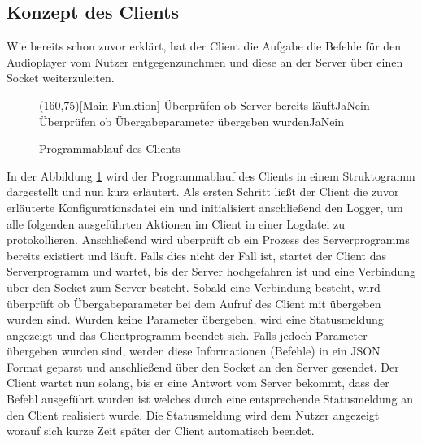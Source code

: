 \subsection{Konzept des Clients}
Wie bereits schon zuvor erklärt, hat der Client die Aufgabe die Befehle für den
Audioplayer vom Nutzer entgegenzunehmen und diese an der Server über einen
Socket weiterzuleiten.

\begin{figure}[H]
    \begin{struktogramm}(160,75)[Main-Funktion] 
         {Überprüfen ob Server bereits läuft}{Ja}{Nein} 
        	\change
        \ifend
         {Überprüfen ob Übergabeparameter übergeben wurden}{Ja}{Nein} 
            \whileend
            \change
        \ifend
    \end{struktogramm} 
\caption{Programmablauf des Clients} 
\label{lst:client_ablauf} 
\end{figure}

In der Abbildung \ref{lst:client_ablauf} wird der Programmablauf des Clients in
einem Struktogramm dargestellt und nun kurz erläutert. Als ersten Schritt ließt
der Client die zuvor erläuterte Konfigurationsdatei ein und initialisiert
anschließend den Logger, um alle folgenden ausgeführten Aktionen im Client in
einer Logdatei zu protokollieren. Anschließend wird überprüft ob ein Prozess
des Serverprogramms bereits existiert und läuft. Falls dies nicht der Fall ist,
startet der Client das Serverprogramm und wartet, bis der Server hochgefahren
ist und eine Verbindung über den Socket zum Server besteht. Sobald eine
Verbindung besteht, wird überprüft ob Übergabeparameter bei dem Aufruf des
Client mit übergeben wurden sind. Wurden keine Parameter übergeben, wird eine
Statusmeldung angezeigt und das Clientprogramm beendet sich. Falls jedoch
Parameter übergeben wurden sind, werden diese Informationen (Befehle) in ein
\ac{JSON} Format geparst und anschließend über den Socket an den Server
gesendet. Der Client wartet nun solang, bis er eine Antwort vom Server bekommt,
dass der Befehl ausgeführt wurden ist welches durch eine entsprechende
Statusmeldung an den Client realisiert wurde. Die Statusmeldung wird dem Nutzer
angezeigt worauf sich kurze Zeit später der Client automatisch beendet.

